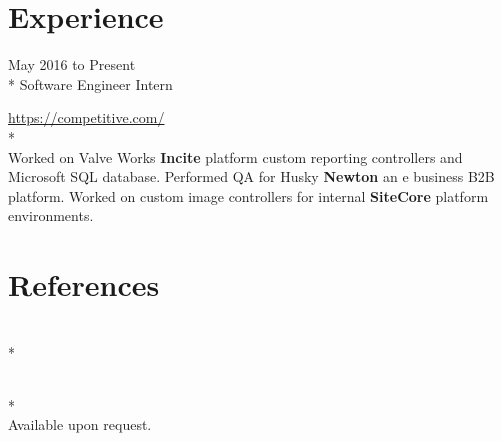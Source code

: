 \documentclass[a4paper,margin,line]{resume}
\newcommand{\rurl}[1]{\hfill {\footnotesize \url{#1}}}
\newcommand{\rdate}[1]{\hfill {\small #1}}
\newcommand{\rproject}[4]{\item[#1] \hfill \rdate{#2} \\* \hfill \rdate{#3} \strut\hfill \rurl{#4} \\*}
\begin{document}
\begin{resume}
\begin{asparadesc}
        
    \end{asparadesc}

\section{\mysidestyle Experience}
	\begin{asparadesc}
        \rproject{Competitive Computing}{May 2016 to Present}{Software Engineer Intern}{https://competitive.com/}
        \\
        \small
        Worked on Valve Works  {\bf Incite} platform custom reporting controllers and Microsoft SQL database. Performed QA for Husky {\bf Newton} an e business B2B platform. Worked on custom image controllers for internal {\bf SiteCore} platform environments.
        \normalsize
        \\
{}
    \end{asparadesc}

\section{\mysidestyle References}
	\begin{asparadesc}
	\rproject{}{}{}{}
	\\
		\small
		Available upon request.
		\normalsize
		\\
{}
    \end{asparadesc}
	
\end{resume}
\end{document}

